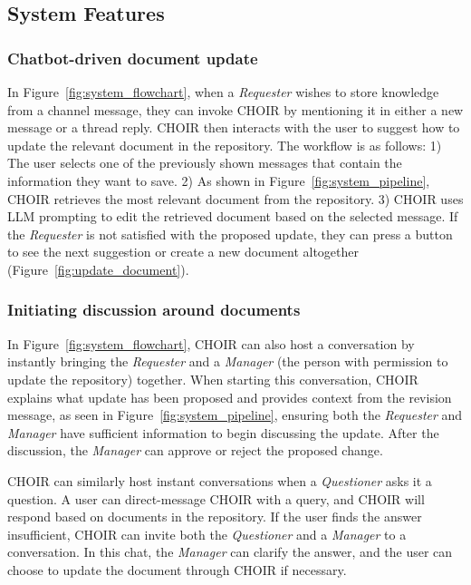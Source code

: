 \documentclass[sigconf,screen]{acmart}
\begin{document}
\subsection{System Features}

\subsubsection{Chatbot-driven document update}
In Figure~\ref{fig:system_flowchart}, when a \textit{Requester} wishes to store knowledge from a channel message, they can invoke CHOIR by mentioning it in either a new message or a thread reply. CHOIR then interacts with the user to suggest how to update the relevant document in the repository. The workflow is as follows: 1) The user selects one of the previously shown messages that contain the information they want to save. 2) As shown in Figure~\ref{fig:system_pipeline}, CHOIR retrieves the most relevant document from the repository. 3) CHOIR uses LLM prompting to edit the retrieved document based on the selected message. If the \textit{Requester} is not satisfied with the proposed update, they can press a button to see the next suggestion or create a new document altogether (Figure~\ref{fig:update_document}). 

\subsubsection{Initiating discussion around documents}
In Figure~\ref{fig:system_flowchart}, CHOIR can also host a conversation by instantly bringing the \textit{Requester} and a \textit{Manager} (the person with permission to update the repository) together. When starting this conversation, CHOIR explains what update has been proposed and provides context from the revision message, as seen in Figure~\ref{fig:system_pipeline}, ensuring both the \textit{Requester} and \textit{Manager} have sufficient information to begin discussing the update. After the discussion, the \textit{Manager} can approve or reject the proposed change.

CHOIR can similarly host instant conversations when a \textit{Questioner} asks it a question. A user can direct-message CHOIR with a query, and CHOIR will respond based on documents in the repository. If the user finds the answer insufficient, CHOIR can invite both the \textit{Questioner} and a \textit{Manager} to a conversation. In this chat, the \textit{Manager} can clarify the answer, and the user can choose to update the document through CHOIR if necessary.
\end{document}
